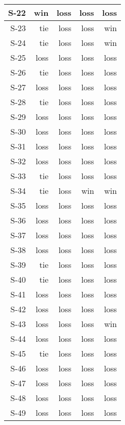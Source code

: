 \begin{tabular}{ | r | r | r | r | r | }
    \hline
         S-22  &    win  &   loss  &   loss  &   loss  \\
    \hline
         S-23  &    tie  &   loss  &   loss  &    win  \\
    \hline
         S-24  &    tie  &   loss  &   loss  &    win  \\
    \hline
         S-25  &   loss  &   loss  &   loss  &   loss  \\
    \hline
         S-26  &    tie  &   loss  &   loss  &   loss  \\
    \hline
         S-27  &   loss  &   loss  &   loss  &   loss  \\
    \hline
         S-28  &    tie  &   loss  &   loss  &   loss  \\
    \hline
         S-29  &   loss  &   loss  &   loss  &   loss  \\
    \hline
         S-30  &   loss  &   loss  &   loss  &   loss  \\
    \hline
         S-31  &   loss  &   loss  &   loss  &   loss  \\
    \hline
         S-32  &   loss  &   loss  &   loss  &   loss  \\
    \hline
         S-33  &    tie  &   loss  &   loss  &   loss  \\
    \hline
         S-34  &    tie  &   loss  &    win  &    win  \\
    \hline
         S-35  &   loss  &   loss  &   loss  &   loss  \\
    \hline
         S-36  &   loss  &   loss  &   loss  &   loss  \\
    \hline
         S-37  &   loss  &   loss  &   loss  &   loss  \\
    \hline
         S-38  &   loss  &   loss  &   loss  &   loss  \\
    \hline
         S-39  &    tie  &   loss  &   loss  &   loss  \\
    \hline
         S-40  &    tie  &   loss  &   loss  &   loss  \\
    \hline
         S-41  &   loss  &   loss  &   loss  &   loss  \\
    \hline
         S-42  &   loss  &   loss  &   loss  &   loss  \\
    \hline
         S-43  &   loss  &   loss  &   loss  &    win  \\
    \hline
         S-44  &   loss  &   loss  &   loss  &   loss  \\
    \hline
         S-45  &    tie  &   loss  &   loss  &   loss  \\
    \hline
         S-46  &   loss  &   loss  &   loss  &   loss  \\
    \hline
         S-47  &   loss  &   loss  &   loss  &   loss  \\
    \hline
         S-48  &   loss  &   loss  &   loss  &   loss  \\
    \hline
         S-49  &   loss  &   loss  &   loss  &   loss  \\
    \hline
\end{tabular}


